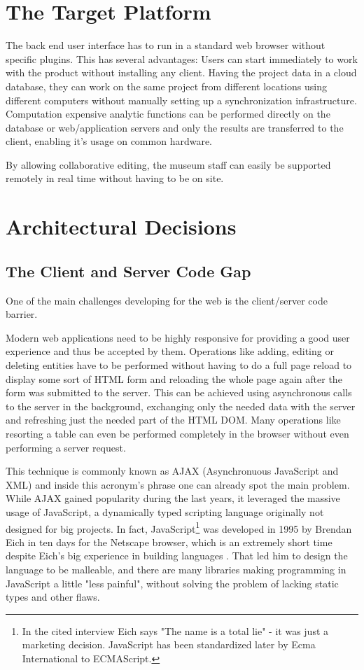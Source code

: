 \section{The Target Platform}

The back end user interface has to run in a standard web browser without specific plugins. This has several advantages: Users can start immediately to work with the product without installing any client. Having the project data in a cloud database, they can work on the same project from different locations using different computers without manually setting up a synchronization infrastructure. Computation expensive analytic functions can be performed directly on the database or web/application servers and only the results are transferred to the client, enabling it's usage on common hardware.

By allowing collaborative editing, the museum staff can easily be supported remotely in real time without having to be on site. 

\section{Architectural Decisions}

\subsection{The Client and Server Code Gap}
One of the main challenges developing for the web is the client/server code barrier. 

Modern web applications need to be highly responsive for providing a good user experience and thus be accepted by them. Operations like adding, editing or deleting entities have to be performed without having to do a full page reload to display some sort of HTML form and reloading the whole page again after the form was submitted to the server. This can be achieved using asynchronous calls to the server in the background, exchanging only the needed data with the server and refreshing just the needed part of the HTML DOM. Many operations like resorting a table can even be performed completely in the browser without even performing a server request.

This technique is commonly known as AJAX (Asynchronuous JavaScript and XML) and inside this acronym's phrase one can already spot the main problem. While AJAX gained popularity during the last years, it leveraged the massive usage of JavaScript, a dynamically typed scripting language originally not designed for big projects. In fact, JavaScript\footnote{In the cited interview Eich says "The name is a total lie" - it was just a marketing decision. JavaScript has been standardized later by Ecma International to ECMAScript.} was developed in 1995 by Brendan Eich in ten days for the Netscape browser, which is an extremely short time despite Eich's big experience in building languages \cite{interview-eich}. That led him to design the language to be malleable, and there are many libraries making programming in JavaScript a little "less painful", without solving the problem of lacking static types and other flaws.

